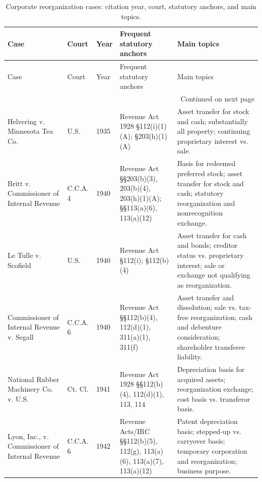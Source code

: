 
\begin{footnotesize}
\begin{longtable}{p{}p{}p{}p{}p{}}
\caption{Corporate reorganization cases: citation year, court, statutory anchors, and main topics.}\\
\toprule
Case & Court & Year & Frequent statutory anchors & Main topics \\
\midrule
\endfirsthead
\toprule
Case & Court & Year & Frequent statutory anchors & Main topics \\
\midrule
\endhead
\midrule
\multicolumn{5}{r}{Continued on next page}\\
\endfoot
\bottomrule
\endlastfoot
Helvering v. Minnesota Tea Co. & U.S. & 1935 & Revenue Act 1928 \S 112(i)(1)(A); \S 203(h)(1)(A) & Asset transfer for stock and cash; substantially all property; continuing proprietary interest vs. sale. \\
Britt v. Commissioner of Internal Revenue & C.C.A. 4 & 1940 & Revenue Act \S\S 203(b)(3), 203(b)(4), 203(h)(1)(A); \S\S 113(a)(6), 113(a)(12) & Basis for redeemed preferred stock; asset transfer for stock and cash; statutory reorganization and nonrecognition exchange. \\
Le Tulle v. Scofield & U.S. & 1940 & Revenue Act \S 112(i); \S 112(b)(4) & Asset transfer for cash and bonds; creditor status vs. proprietary interest; sale or exchange not qualifying as reorganization. \\
Commissioner of Internal Revenue v. Segall & C.C.A. 6 & 1940 & Revenue Act \S\S 112(b)(4), 112(d)(1), 311(a)(1), 311(f) & Asset transfer and dissolution; sale vs. tax-free reorganization; cash and debenture consideration; shareholder transferee liability. \\
National Rubber Machinery Co. v. U.S. & Ct. Cl. & 1941 & Revenue Act 1928 \S\S 112(b)(4), 112(d)(1), 113, 114 & Depreciation basis for acquired assets; reorganization exchange; cost basis vs. transferor basis. \\
Lyon, Inc., v. Commissioner of Internal Revenue & C.C.A. 6 & 1942 & Revenue Acts/IRC \S\S 112(b)(5), 112(g), 113(a)(6), 113(a)(7), 113(a)(12) & Patent depreciation basis; stepped-up vs. carryover basis; temporary corporation and reorganization; business purpose. \\

\end{longtable}
\end{footnotesize}

